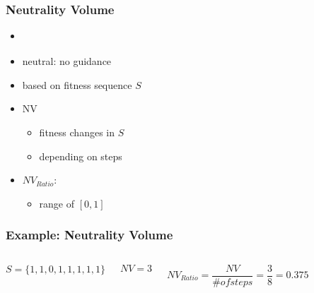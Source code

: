 \begin{frame}
	\frametitle{Neutrality Volume}
	
	\begin{itemize}
		\item \cite{Albunian.2020}
		\item neutral: no guidance
		\item based on fitness sequence $S$
		\item NV
		\begin{itemize}
			\item fitness changes in $S$
			\item depending on steps
		\end{itemize}
		\item $NV_{Ratio}$:
		\begin{itemize}
			\item range of $[0,1]$
		\end{itemize}
	\end{itemize}	

	
\end{frame}

\begin{frame}
	\frametitle{Example: Neutrality Volume}
	
	\begin{columns}[c]
		
		
		\begin{equation}
			S = \{1, 1, 0, 1, 1, 1, 1, 1\}
		\end{equation}
	
		\begin{equation}
			NV = 3
		\end{equation}
	
		\begin{equation}
			NV_{Ratio} = \frac{NV}{\# of steps} = \frac{3}{8} = 0.375
		\end{equation}
	
		\begin{figure}
			\includegraphics[width=1\textwidth]{figures/plot_no_guidance}
		\end{figure}
		
	\end{columns}	

\end{frame}

